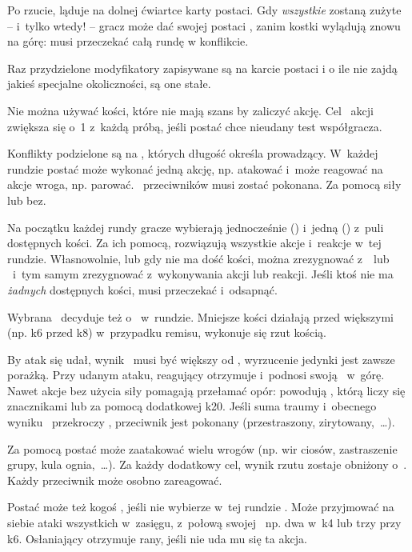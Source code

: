 {	\tableTargets

	\noindent
	Po rzucie,  ląduje na dolnej ćwiartce karty postaci. Gdy \emph{wszystkie} zostaną zużyte -- i~tylko wtedy! -- gracz może dać swojej postaci , zanim kostki wylądują znowu na górę: musi przeczekać całą rundę w konflikcie.

	Raz przydzielone modyfikatory zapisywane są na karcie postaci i o ile nie zajdą jakieś specjalne okoliczności, są one stałe.

	Nie można używać kości, które nie mają szans by zaliczyć akcję. Cel \TN\ akcji zwiększa się o~1 z~każdą próbą, jeśli postać chce  nieudany test współgracza.


	\noindent
	Konflikty podzielone są na , których długość określa prowadzący. W~każdej rundzie postać może wykonać jedną akcję, np. atakować i~może reagować na akcje wroga, np. parować. \HD\ przeciwników musi zostać pokonana. Za pomocą siły lub bez.

	Na początku każdej rundy gracze wybierają jednocześnie  (\AD) i~jedną  (\RD) z~puli dostępnych kości. Za ich pomocą, rozwiązują wszystkie akcje i~reakcje w~tej rundzie. Własnowolnie, lub gdy nie ma dość kości, można zrezygnować z~\AD\ lub \RD\ i~tym samym zrezygnować z~wykonywania akcji lub reakcji. Jeśli ktoś nie ma \emph{żadnych} dostępnych kości, musi przeczekać i~odsapnąć.

	Wybrana \AD\ decyduje też o~ w~rundzie. Mniejsze kości działają przed większymi (np. k6 przed k8) w~przypadku remisu, wykonuje się rzut kością.

	By atak się udał, wynik \AD\ musi być większy od \RD, wyrzucenie jedynki jest zawsze porażką. Przy udanym ataku, reagujący otrzymuje  i~podnosi swoją \HD\ w~górę. Nawet akcje bez użycia siły pomagają przełamać opór: powodują , którą liczy się znacznikami lub za pomocą dodatkowej k20. Jeśli suma traumy i~obecnego wyniku \HD\ przekroczy \HD, przeciwnik jest pokonany (przestraszony, zirytowany,~\ldots).

	Za pomocą  postać może zaatakować wielu wrogów (np. wir ciosów, zastraszenie grupy, kula ognia,~\ldots). Za każdy dodatkowy cel, wynik rzutu zostaje obniżony o~. Każdy przeciwnik może osobno zareagować.

	Postać może też kogoś , jeśli nie wybierze w~tej rundzie \AD. Może przyjmować na siebie ataki wszystkich w~zasięgu, z~połową swojej \RD\, np. dwa w~k4 lub trzy przy k6. Osłaniający otrzymuje rany, jeśli nie uda mu się ta akcja.

}
